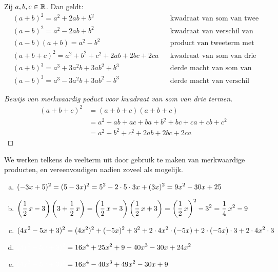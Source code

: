 \documentclass{ximera}
\begin{document}
	\begin{proposition} 
	Zij $a,b,c \in \mathbb{R}$. Dan geldt:
	\begin{align*}
	& (a+b)^2 = a^2+2ab+b^2 && \text{kwadraat van som van twee termen} \\
	& (a-b)^2 = a^2-2ab+b^2 && \text{kwadraat van verschil van twee termen} \\
	& (a-b)(a+b) = a^2-b^2 && \text{product van tweeterm met zijn toegevoegde} \\
	& (a+b+c)^2 = a^2 + b^2 + c^2 + 2ab + 2bc + 2ca && \text{kwadraat van som van drie termen} \\
	& (a+b)^3 = a^3+3a^2b+3ab^2+b^3 && \text{derde macht van som van twee termen} \\
	& (a-b)^3 = a^3-3a^2b+3ab^2-b^3 && \text{derde macht van verschil van twee termen.}
	\end{align*}
	\end{proposition} 
	
	
	\begin{proof}[Bewijs van merkwaardig poduct voor kwadraat van som van drie termen]
	
	\begin{align}
	(a+b+c)^2 
	& = (a+b+c)(a+b+c) \nonumber \\
	& = a^2 + ab + ac + ba + b^2 + bc + ca + cb + c^2 \nonumber \\
	& = a^2 + b^2 + c^2 + 2ab + 2bc + 2ca \tag*{\qedhere}
	\end{align}
	
	\end{proof}
	
	
	\begin{example} 
	We werken telkens de veelterm uit door gebruik te maken van merkwaardige producten, en vereenvoudigen nadien zoveel als mogelijk.
	\begin{enumerate}[(a)]
	\item 
	$\displaystyle (-3x+5)^2 = (5-3x)^2 = 5^2 - 2 \cdot 5 \cdot 3x + (3x)^2 = 9x^2 - 30x + 25$
	\item 
	$\displaystyle \left(\frac{1}{2}\,x-3\right)\left(3+\frac{1}{2}\,x\right) = \left(\frac{1}{2}\,x-3\right)\left(\frac{1}{2}\,x+3\right) = \left(\frac{1}{2}\,x\right)^2 - 3^2 = \frac{1}{4}\,x^2 - 9$
	\item
	$\displaystyle (4x^2 - 5x + 3)^2 = (4x^2)^2 + (-5x)^2 + 3^2 + 2 \cdot 4x^2 \cdot (-5x) + 2\cdot (-5x) \cdot 3 + 2 \cdot 4x^2 \cdot 3$
	\item[]
	$\D \mph{(4x^2 - 5x + 3)^2} = 16x^4 + 25x^2 + 9 -40x^3 - 30x + 24x^2$
	\item[]
	$\D \mph{(4x^2 - 5x + 3)^2} = 16x^4 - 40x^3 + 49x^2 - 30x + 9$
	\end{enumerate}
	\end{example} 
	
	
	
	
	
	
	
	
	
	
	
\end{document}
